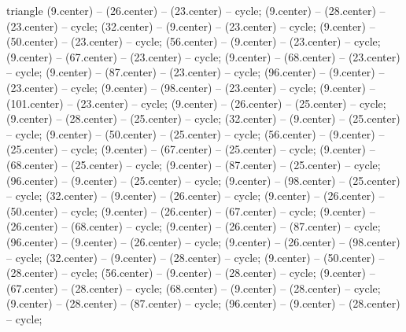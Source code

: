 \begin{pgfonlayer}{triangle}
 (9.center) -- (26.center) -- (23.center) -- cycle; 
 (9.center) -- (28.center) -- (23.center) -- cycle; 
 (32.center) -- (9.center) -- (23.center) -- cycle; 
 (9.center) -- (50.center) -- (23.center) -- cycle; 
 (56.center) -- (9.center) -- (23.center) -- cycle; 
 (9.center) -- (67.center) -- (23.center) -- cycle; 
 (9.center) -- (68.center) -- (23.center) -- cycle; 
 (9.center) -- (87.center) -- (23.center) -- cycle; 
 (96.center) -- (9.center) -- (23.center) -- cycle; 
 (9.center) -- (98.center) -- (23.center) -- cycle; 
 (9.center) -- (101.center) -- (23.center) -- cycle; 
 (9.center) -- (26.center) -- (25.center) -- cycle; 
 (9.center) -- (28.center) -- (25.center) -- cycle; 
 (32.center) -- (9.center) -- (25.center) -- cycle; 
 (9.center) -- (50.center) -- (25.center) -- cycle; 
 (56.center) -- (9.center) -- (25.center) -- cycle; 
 (9.center) -- (67.center) -- (25.center) -- cycle; 
 (9.center) -- (68.center) -- (25.center) -- cycle; 
 (9.center) -- (87.center) -- (25.center) -- cycle; 
 (96.center) -- (9.center) -- (25.center) -- cycle; 
 (9.center) -- (98.center) -- (25.center) -- cycle; 
 (32.center) -- (9.center) -- (26.center) -- cycle; 
 (9.center) -- (26.center) -- (50.center) -- cycle; 
 (9.center) -- (26.center) -- (67.center) -- cycle; 
 (9.center) -- (26.center) -- (68.center) -- cycle; 
 (9.center) -- (26.center) -- (87.center) -- cycle; 
 (96.center) -- (9.center) -- (26.center) -- cycle; 
 (9.center) -- (26.center) -- (98.center) -- cycle; 
 (32.center) -- (9.center) -- (28.center) -- cycle; 
 (9.center) -- (50.center) -- (28.center) -- cycle; 
 (56.center) -- (9.center) -- (28.center) -- cycle; 
 (9.center) -- (67.center) -- (28.center) -- cycle; 
 (68.center) -- (9.center) -- (28.center) -- cycle; 
 (9.center) -- (28.center) -- (87.center) -- cycle; 
 (96.center) -- (9.center) -- (28.center) -- cycle; 

\end{pgfonlayer}
